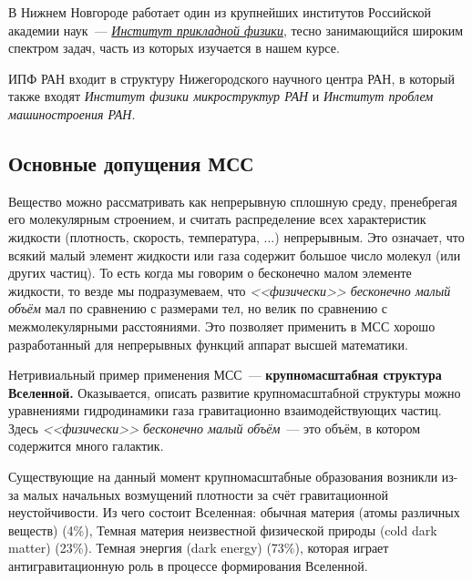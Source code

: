 В Нижнем Новгороде работает один из крупнейших институтов Российской академии наук~--- \href{https://www.ipfran.ru}{\textit{Институт прикладной физики}}\footnotemark, тесно занимающийся широким спектром задач, часть из которых изучается в нашем курсе.

ИПФ РАН входит в структуру Нижегородского научного центра РАН, в который также входят \textit{Институт физики микроструктур РАН} и \textit{Институт проблем машиностроения РАН}.



\subsection{Основные допущения МСС}
Вещество можно рассматривать как непрерывную сплошную среду, пренебрегая его молекулярным строением, и считать распределение всех характеристик жидкости (плотность, скорость, температура, $\ldots$) непрерывным.
%
Это означает, что всякий малый элемент жидкости или газа содержит большое число молекул (или других частиц). То есть когда мы говорим о бесконечно малом элементе жидкости, то везде мы подразумеваем,  что \textit{<<физически>> бесконечно малый объём} мал по сравнению с размерами тел, но велик по сравнению с межмолекулярными расстояниями.
%
Это позволяет применить в МСС хорошо разработанный для непрерывных функций аппарат высшей математики.

Нетривиальный пример применения МСС~--- \textbf{крупномасштабная структура  Вселенной.} Оказывается, описать развитие крупномасштабной структуры можно уравнениями гидродинамики газа гравитационно взаимодействующих частиц. Здесь \emph{<<физически>> бесконечно малый объём}~--- это объём, в котором содержится много галактик.

Существующие на данный момент крупномасштабные образования возникли из-за малых начальных возмущений плотности за счёт гравитационной неустойчивости. Из чего состоит Вселенная: обычная материя (атомы различных веществ) (4\%), Темная материя неизвестной физической природы (cold dark matter) (23\%). Темная энергия (dark energy) (73\%), которая играет антигравитационную роль в процессе формирования Вселенной.

